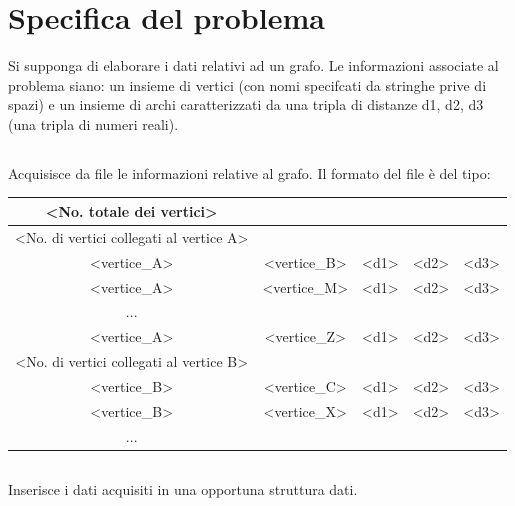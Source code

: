 \documentclass[11pt, a4paper, titlepage, block]{article}
\begin{document}
\section{Specifica del problema}
	Si supponga di elaborare i dati relativi ad un grafo. Le informazioni associate al problema siano: un insieme di vertici (con nomi specifcati da stringhe prive di spazi) e un insieme di archi caratterizzati da una tripla di distanze d1, d2, d3 (una tripla di numeri reali).
	\subsection{}
	Acquisisce da file le informazioni relative al grafo. Il formato del file \`{e} del tipo:\\
	\begin{tabular}{|c|c|c|c|c|}
\hline
	{\textless}No. totale dei vertici{\textgreater} & & & & \\
\hline
	{\textless}No. di vertici collegati al vertice A{\textgreater} & & & & \\
\hline
	{\textless}vertice\_A{\textgreater} & {\textless}vertice\_B{\textgreater} & {\textless}d1{\textgreater} & {\textless}d2{\textgreater} & {\textless}d3{\textgreater}\\
\hline
	{\textless}vertice\_A{\textgreater} & {\textless}vertice\_M{\textgreater} & {\textless}d1{\textgreater} & {\textless}d2{\textgreater} & {\textless}d3{\textgreater}\\
\hline
	... & & & &\\
\hline
	{\textless}vertice\_A{\textgreater} & {\textless}vertice\_Z{\textgreater} & {\textless}d1{\textgreater} & {\textless}d2{\textgreater} & {\textless}d3{\textgreater}\\
\hline
	{\textless}No. di vertici collegati al vertice B{\textgreater} & & & &\\
\hline
	{\textless}vertice\_B{\textgreater} & {\textless}vertice\_C{\textgreater} & {\textless}d1{\textgreater} & {\textless}d2{\textgreater} & {\textless}d3{\textgreater}\\
\hline
	{\textless}vertice\_B{\textgreater} & {\textless}vertice\_X{\textgreater} & {\textless}d1{\textgreater} & {\textless}d2{\textgreater} & {\textless}d3{\textgreater}\\
\hline
	... & & & &\\
\hline
\end{tabular}
	\subsection{}
	Inserisce i dati acquisiti in una opportuna struttura dati.
\end{document}

